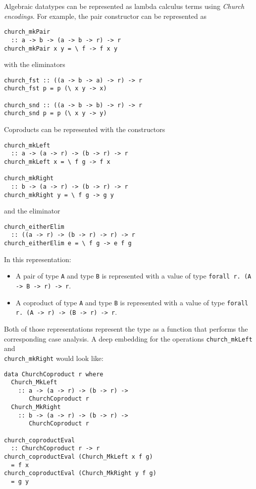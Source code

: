 \documentclass[sigplan,anonymous,review]{acmart}
\newcommand{\ttt}{\texttt}
\begin{document}
Algebraic datatypes can be represented as lambda calculus terms using
\textit{Church encodings}. For example, the pair constructor can be
represented as

\begin{lstlisting}
church_mkPair
  :: a -> b -> (a -> b -> r) -> r
church_mkPair x y = \ f -> f x y
\end{lstlisting}

with the eliminators

\begin{lstlisting}
church_fst :: ((a -> b -> a) -> r) -> r
church_fst p = p (\ x y -> x)

church_snd :: ((a -> b -> b) -> r) -> r
church_snd p = p (\ x y -> y)
\end{lstlisting}


Coproducts can be represented with the constructors

\begin{lstlisting}
church_mkLeft
  :: a -> (a -> r) -> (b -> r) -> r
church_mkLeft x = \ f g -> f x

church_mkRight
  :: b -> (a -> r) -> (b -> r) -> r
church_mkRight y = \ f g -> g y
\end{lstlisting}

and the eliminator

\begin{lstlisting}
church_eitherElim
  :: ((a -> r) -> (b -> r) -> r) -> r
church_eitherElim e = \ f g -> e f g
\end{lstlisting}

In this representation:

\begin{itemize}
  \item A pair of type \ttt{A} and type \ttt{B} is represented with a value of type
\ttt{forall r. (A -> B -> r) -> r}.

  \item A coproduct of type \ttt{A} and type \ttt{B} is represented with a value of type
\ttt{forall r. (A -> r) -> (B -> r) -> r}.
\end{itemize}

Both of those representations represent the type as a function that performs the
corresponding case analysis. A deep embedding for the operations
\ttt{church\_mkLeft} and \\ \ttt{church\_mkRight} would look
like:

\begin{lstlisting}
data ChurchCoproduct r where
  Church_MkLeft
    :: a -> (a -> r) -> (b -> r) ->
       ChurchCoproduct r
  Church_MkRight
    :: b -> (a -> r) -> (b -> r) ->
       ChurchCoproduct r

church_coproductEval
  :: ChurchCoproduct r -> r
church_coproductEval (Church_MkLeft x f g)
  = f x
church_coproductEval (Church_MkRight y f g)
  = g y
\end{lstlisting}
\end{document}
